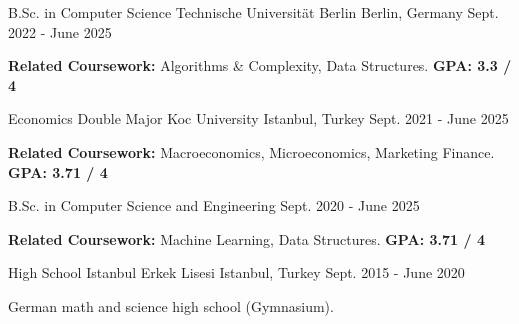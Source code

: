 
\begin{cventries}
  \cventry
    {B.Sc. in Computer Science}
    {Technische Universität Berlin}
    {Berlin, Germany}
    {Sept. 2022 - June 2025}
    {
      \begin{cvitems}
      \item {\textbf{Related Coursework: }Algorithms \& Complexity, Data Structures. \textbf{GPA: 3.3 / 4}}
      \end{cvitems}
    }

  \cventry
    {Economics Double Major}
    {Koc University}
    {Istanbul, Turkey}
    {Sept. 2021 - June 2025}
    {
      \begin{cvitems}
      \item {\textbf{Related Coursework:} Macroeconomics, Microeconomics, Marketing Finance. \textbf{GPA: 3.71 / 4}}
      \end{cvitems}
    }

  \cventry
    {B.Sc. in Computer Science and Engineering}
    {}
    {}
    {Sept. 2020 - June 2025}
    {
      \begin{cvitems}
        \item {\textbf{Related Coursework:} Machine Learning, Data Structures. \textbf{GPA: 3.71 / 4}}
      \end{cvitems}
    }

  \cventry
    {High School}
    {Istanbul Erkek Lisesi}
    {Istanbul, Turkey}
    {Sept. 2015 - June 2020}
    {
      \begin{cvitems}
      \item {German math and science high school (Gymnasium).}
      \end{cvitems}
    }

\end{cventries}
